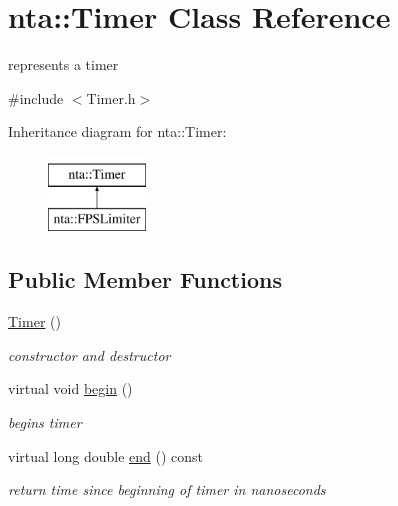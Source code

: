 \hypertarget{classnta_1_1Timer}{}\section{nta\+:\+:Timer Class Reference}
\label{classnta_1_1Timer}


represents a timer  




{\ttfamily \#include $<$Timer.\+h$>$}

Inheritance diagram for nta\+:\+:Timer\+:\begin{figure}[H]
\begin{center}
\leavevmode
\includegraphics[height=2.000000cm]{d6/dd4/classnta_1_1Timer}
\end{center}
\end{figure}
\subsection*{Public Member Functions}
\begin{DoxyCompactItemize}
\item 
\mbox{\label{classnta_1_1Timer_ac92420dd62672b399f1b4adfd81a4007}} 
\hyperlink{classnta_1_1Timer_ac92420dd62672b399f1b4adfd81a4007}{Timer} ()
\begin{DoxyCompactList}\small\item\em constructor and destructor \end{DoxyCompactList}\item 
\mbox{\label{classnta_1_1Timer_a4192089df7b162096d119a7d9438173f}} 
virtual void \hyperlink{classnta_1_1Timer_a4192089df7b162096d119a7d9438173f}{begin} ()
\begin{DoxyCompactList}\small\item\em begins timer \end{DoxyCompactList}\item 
\mbox{\label{classnta_1_1Timer_adb7a179f51224cca3e4c2f8f8bc20a19}} 
virtual long double \hyperlink{classnta_1_1Timer_adb7a179f51224cca3e4c2f8f8bc20a19}{end} () const
\begin{DoxyCompactList}\small\item\em return time since beginning of timer in nanoseconds \end{DoxyCompactList}\end{DoxyCompactItemize}
